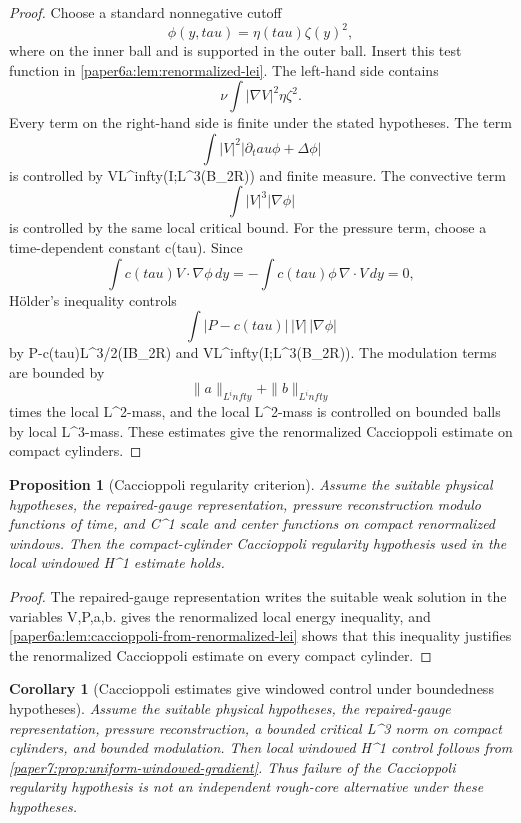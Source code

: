 \documentclass[11pt]{amsart}
\def\({}%
\def\){}%
\def\tau{tau}%
\def\infty{infty}%
\theoremstyle{plain}
\newtheorem{proposition}[proposition]{Proposition}
\newtheorem{corollary}[corollary]{Corollary}
\theoremstyle{definition}
\theoremstyle{remark}
\begin{document}
\begin{proof}
Choose a standard nonnegative cutoff
\[
  \phi(y,\tau)=\eta(\tau)\zeta(y)^2,
\]
where \(\zeta{}\) on the inner ball and \(\zeta\) is supported in the
outer ball.  Insert this test function in
\cref{paper6a:lem:renormalized-lei}.  The left-hand side contains
\[
  \nu\int |\nabla V|^2\eta\zeta^2 .
\]
Every term on the right-hand side is finite under the stated hypotheses.  The term
\[
  \int |V|^2|\partial_\tau\phi+\Delta\phi|
\]
is controlled by \(V\in L^\infty(I;L^3(B_{2R}))\) and finite measure.  The
convective term
\[
  \int |V|^3|\nabla\phi|
\]
is controlled by the same local critical bound.  For the pressure term, choose
a time-dependent constant \(c(\tau)\).  Since
\[
  \int c(\tau)V\cdot\nabla\phi\,dy
  =
  -\int c(\tau)\phi\,\nabla\cdot V\,dy=0,
\]
Hölder's inequality controls
\[
  \int |P-c(\tau)|\,|V|\,|\nabla\phi|
\]
by \(P-c(\tau)\in L^{3/2}(I\times B_{2R})\) and
\(V\in L^\infty(I;L^3(B_{2R}))\).  The
modulation terms are bounded by
\[
  \|a\|_{L^\infty}+\|b\|_{L^\infty}
\]
times the local \(L^2\)-mass, and the local \(L^2\)-mass is controlled on
bounded balls by local \(L^3\)-mass.  These estimates give the
renormalized Caccioppoli estimate on compact cylinders.
\end{proof}

\begin{proposition}[Caccioppoli regularity criterion]\label{paper6a:prop:caccioppoli-regularity-criterion}
Assume the suitable physical hypotheses, the repaired-gauge representation, pressure
reconstruction modulo functions of time, and \(C^1\) scale and center functions
on compact renormalized windows.  Then the compact-cylinder Caccioppoli
regularity hypothesis used in the local windowed \(H^1\) estimate holds.
\end{proposition}

\begin{proof}
The repaired-gauge representation writes the suitable weak solution in the
variables \(V,P,a,b\).   gives the
renormalized local energy inequality, and
\cref{paper6a:lem:caccioppoli-from-renormalized-lei} shows that this inequality
justifies the renormalized Caccioppoli estimate on every compact cylinder.
\end{proof}

\begin{corollary}[Caccioppoli estimates give windowed control under boundedness hypotheses]
\label{paper6a:cor:caccioppoli-windowed-control}
Assume the suitable physical hypotheses, the repaired-gauge representation, pressure
reconstruction, a bounded critical \(L^3\) norm on compact cylinders, and
bounded modulation.  Then local windowed \(H^1\) control follows from
\cref{paper7:prop:uniform-windowed-gradient}.  Thus failure of the Caccioppoli
regularity hypothesis is not an independent rough-core alternative under these
hypotheses.
\end{corollary}
\end{document}
